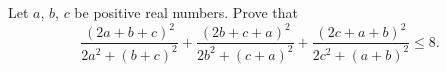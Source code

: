 Let $ a$,  $ b$,  $ c$ be positive real numbers. Prove that\[ \dfrac{(2a + b + c)^2}{2a^2 + (b + c)^2} + \dfrac{(2b + c + a)^2}{2b^2 + (c + a)^2} + \dfrac{(2c + a + b)^2}{2c^2 + (a + b)^2} \le 8.
\]

